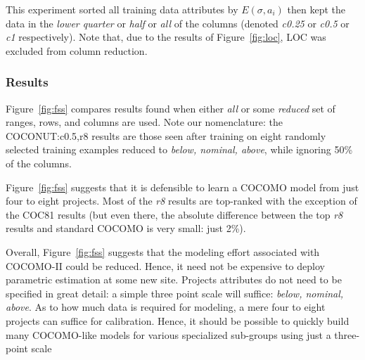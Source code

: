 \documentclass[smallcondesed]{svjour3}
\newcommand{\fig}[1]{Figure~\ref{fig:#1}}
\begin{document}
This experiment sorted all training data attributes by $E(\sigma,a_i)$ then kept
the data in the {\em lower quarter} or  {\em half} or {\em all} of  the columns
(denoted {\em c0.25} or {\em c0.5} or {\em c1} respectively).
Note that, due to the results of \fig{loc}, LOC was excluded from column reduction.



\subsubsection{Results}

\fig{fss} compares results found when either
{\em all} or some {\em reduced} set of ranges, rows,
and columns are used. Note our nomenclature:  the
COCONUT:c0.5,r8  results are those
seen after training on eight randomly selected
training examples reduced to {\em below, nominal,
above}, while ignoring 50\% of the columns. 


 \fig{fss} suggests that it is defensible
to learn a COCOMO model from just four to eight projects. Most of the
{\em r8} results are top-ranked with the exception
of the COC81 results (but even there, the absolute
difference between the top {\em r8} results and
standard COCOMO is very small: just 2\%).

Overall, \fig{fss} suggests that the modeling
effort associated with COCOMO-II could be reduced. Hence,
it need not be expensive to deploy parametric estimation
at some new site.
Projects attributes
do not need to be specified in great detail:
a simple three point scale will suffice:
 {\em below, nominal, above}. As to how much data is
required for modeling, 
a mere four to eight projects can
suffice for calibration.
Hence, it
should be possible to quickly build many COCOMO-like
models for various specialized sub-groups using just
a three-point scale









\end{document}
